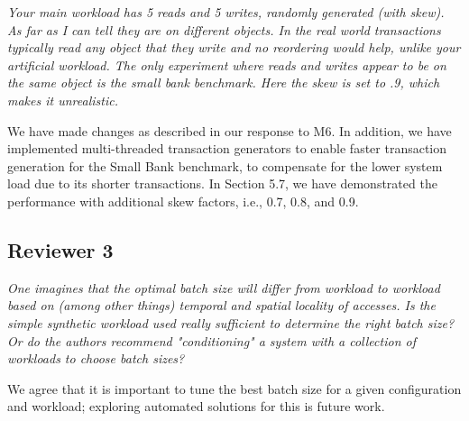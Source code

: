 \documentclass{article}
\begin{document}
\emph{Your main workload has 5 reads and 5 writes, randomly generated (with skew). As far as I can tell they are on different objects. In the real world transactions typically read any object that they write and no reordering would help, unlike your artificial workload. The only experiment where reads and writes appear to be on the same object is the small bank benchmark. Here the skew is set to .9, which makes it unrealistic. }

We have made changes as described in our response to M6. In addition, we have implemented multi-threaded transaction generators to enable faster transaction generation for the Small Bank benchmark, to compensate for the lower system load due to its shorter transactions. In Section 5.7, we have demonstrated the performance with additional skew factors, i.e., 0.7, 0.8, and 0.9.

\subsection{Reviewer 3}

\emph{One imagines that the optimal batch size will differ from workload to workload based on (among other things) temporal and spatial locality of accesses. Is the simple synthetic workload used really sufficient to determine the right batch size? Or do the authors recommend "conditioning" a system with a collection of workloads to choose batch sizes?}

We agree that it is important to tune the best batch size for a given configuration and workload; exploring automated solutions for this is future work.
\end{document}
